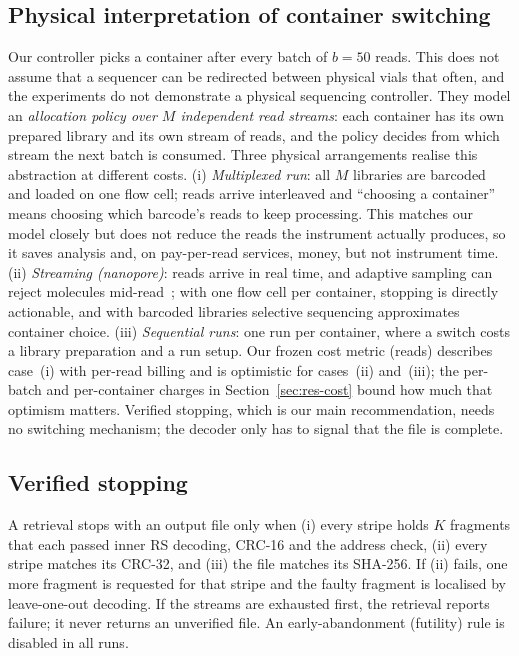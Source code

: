 \documentclass[conference,onecolumn,11pt]{IEEEtran}
\begin{document}
\subsection{Physical interpretation of container switching}
\label{sec:ops}
Our controller picks a container after every batch of $b{=}50$ reads.  This does not assume that a
sequencer can be redirected between physical vials that often, and the experiments do not demonstrate a
physical sequencing controller.  They model an \emph{allocation policy over $M$ independent read
streams}: each container has its own prepared library and its own stream of reads, and the policy
decides from which stream the next batch is consumed.  Three physical arrangements realise this
abstraction at different costs.  (i) \emph{Multiplexed run}: all $M$
libraries are barcoded and loaded on one flow cell; reads arrive interleaved and ``choosing a
container'' means choosing which barcode's reads to keep processing.  This matches our model closely
but does not reduce the reads the instrument actually produces, so it saves analysis and, on
pay-per-read services, money, but not instrument time.  (ii) \emph{Streaming (nanopore)}: reads
arrive in real time, and adaptive sampling can reject molecules mid-read~\cite{loose2016real,payne2021readfish};
with one flow cell per container, stopping is directly actionable, and with barcoded libraries
selective sequencing approximates container choice.  (iii) \emph{Sequential runs}: one run per
container, where a switch costs a library preparation and a run setup.  Our frozen cost metric (reads)
describes case~(i) with per-read billing and is optimistic for cases~(ii) and~(iii); the per-batch and
per-container charges in Section~\ref{sec:res-cost} bound how much that optimism matters.  Verified
stopping, which is our main recommendation, needs no switching mechanism; the decoder only has to
signal that the file is complete.



\subsection{Verified stopping}
A retrieval stops with an output file only when (i) every stripe holds $K$ fragments that each
passed inner RS decoding, CRC-16 and the address check, (ii) every stripe matches its CRC-32, and
(iii) the file matches its SHA-256.  If (ii) fails, one more fragment is requested for that
stripe and the faulty fragment is localised by leave-one-out decoding.  If the streams are
exhausted first, the retrieval reports failure; it never returns an unverified file.  An
early-abandonment (futility) rule is disabled in all runs.
\end{document}
